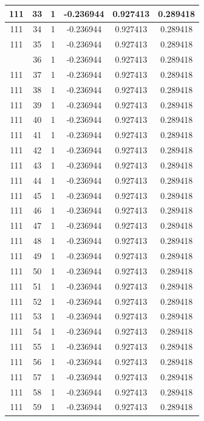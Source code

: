 \documentclass[12pt,a4paper]{article}
\numberwithin{equation}{section}
\numberwithin{figure}{section}
\numberwithin{table}{section}
\begin{document}
\begin{longtable}{|c|c|c|c|c|c|}
111 & 33 & 1 & -0.236944 & 0.927413 & 0.289418 \\ \hline
111 & 34 & 1 & -0.236944 & 0.927413 & 0.289418 \\ \hline
111 & 35 & 1 & -0.236944 & 0.927413 & 0.289418 \\ \hline
\pagebreak
111 & 36 & 1 & -0.236944 & 0.927413 & 0.289418 \\ \hline
111 & 37 & 1 & -0.236944 & 0.927413 & 0.289418 \\ \hline
111 & 38 & 1 & -0.236944 & 0.927413 & 0.289418 \\ \hline
111 & 39 & 1 & -0.236944 & 0.927413 & 0.289418 \\ \hline
111 & 40 & 1 & -0.236944 & 0.927413 & 0.289418 \\ \hline
111 & 41 & 1 & -0.236944 & 0.927413 & 0.289418 \\ \hline
111 & 42 & 1 & -0.236944 & 0.927413 & 0.289418 \\ \hline
111 & 43 & 1 & -0.236944 & 0.927413 & 0.289418 \\ \hline
111 & 44 & 1 & -0.236944 & 0.927413 & 0.289418 \\ \hline
111 & 45 & 1 & -0.236944 & 0.927413 & 0.289418 \\ \hline
111 & 46 & 1 & -0.236944 & 0.927413 & 0.289418 \\ \hline
111 & 47 & 1 & -0.236944 & 0.927413 & 0.289418 \\ \hline
111 & 48 & 1 & -0.236944 & 0.927413 & 0.289418 \\ \hline
111 & 49 & 1 & -0.236944 & 0.927413 & 0.289418 \\ \hline
111 & 50 & 1 & -0.236944 & 0.927413 & 0.289418 \\ \hline
111 & 51 & 1 & -0.236944 & 0.927413 & 0.289418 \\ \hline
111 & 52 & 1 & -0.236944 & 0.927413 & 0.289418 \\ \hline
111 & 53 & 1 & -0.236944 & 0.927413 & 0.289418 \\ \hline
111 & 54 & 1 & -0.236944 & 0.927413 & 0.289418 \\ \hline
111 & 55 & 1 & -0.236944 & 0.927413 & 0.289418 \\ \hline
111 & 56 & 1 & -0.236944 & 0.927413 & 0.289418 \\ \hline
111 & 57 & 1 & -0.236944 & 0.927413 & 0.289418 \\ \hline
111 & 58 & 1 & -0.236944 & 0.927413 & 0.289418 \\ \hline
111 & 59 & 1 & -0.236944 & 0.927413 & 0.289418 \\ \hline

\end{longtable}
\end{document}
